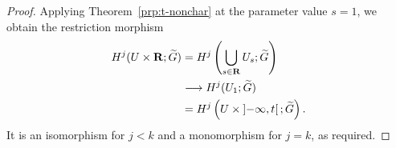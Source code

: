 \begin{proof}
  Applying Theorem~\ref{prp:t-nonchar} at the parameter value \(s=1\),
  we obtain the restriction morphism
  \begin{align*}
    H^j(U\times\mathbf{R};\widetilde{G})
    &=H^j\left(\bigcup_{s\in\mathbf{R}}U_s;\widetilde{G}\right)\\
    &\longrightarrow H^j(U_1;\widetilde{G})\\
    &=H^j\left(U\times\left]-\infty,t\right[;\widetilde{G}\right).
  \end{align*}
  It is an isomorphism for \(j<k\) and a monomorphism for \(j=k\),
  as required.

\end{proof}

